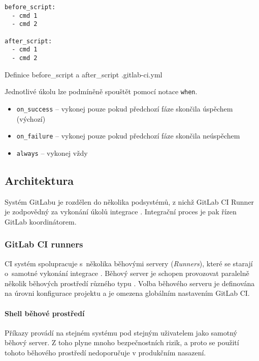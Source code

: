 \begin{listing}[ht]
\begin{verbatim}
before_script:
  - cmd 1
  - cmd 2

after_script:
  - cmd 1
  - cmd 2
\end{verbatim}
\caption{Definice before\_script a after\_script .gitlab-ci.yml}
\end{listing}

Jednotlivé úkolu lze podmíněně spouštět pomocí notace \verb|when|.

\begin{itemize}
  \item \verb|on_success| -- vykonej pouze pokud předchozí fáze skončila úspěchem (výchozí) 
  \item \verb|on_failure| -- vykonej pouze pokud předchozí fáze skončila neúspěchem
  \item \verb|always| -- vykonej vždy
\end{itemize}

\subsection{Architektura}

Systém GitLabu je rozdělen do několika podsystémů, z nichž GitLab CI Runner je zodpovědný za vykonání úkolů integrace \cite{gitlab_architecture}.
Integrační proces je pak řízen GitLab koordinátorem.

\subsubsection{GitLab CI runners}

CI systém spolupracuje s~několika běhovými servery (\textit{Runners}), které se starají o~samotné vykonání integrace \cite{gitlab_runners}.
Běhový server je schopen provozovat paralelně několik běhových prostředí různého typu \cite{gitlab_executors}.
Volba běhového serveru je definována na úrovni konfigurace projektu a je omezena globálním nastavením GitLab CI.

\paragraph{Shell běhové prostředí}

Příkazy provádí na stejném systému pod stejným uživatelem jako samotný běhový server.
Z toho plyne mnoho bezpečnostních rizik, a proto se použití tohoto běhového prostředí nedoporučuje v produkčním nasazení.

